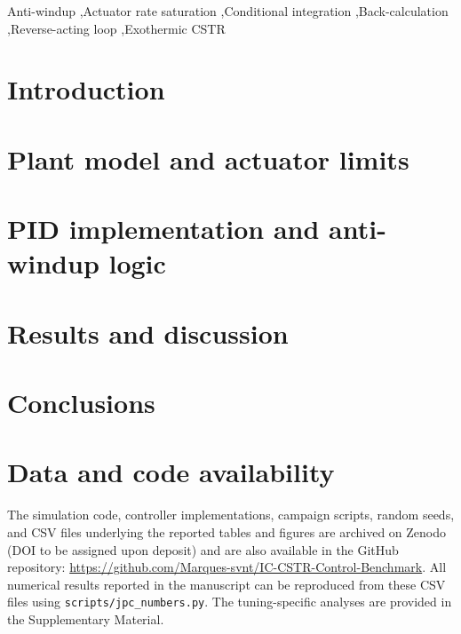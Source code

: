 \documentclass[a4paper,fleqn]{cas-dc}
\begin{document}


\begin{keywords}
Anti-windup \sep Actuator rate saturation \sep Conditional integration \sep Back-calculation \sep Reverse-acting loop \sep Exothermic CSTR
\end{keywords}

\maketitle

\section{Introduction}\label{sec:intro}


\section{Plant model and actuator limits}\label{sec:model}


\section{PID implementation and anti-windup logic}\label{sec:pid}


\section{Results and discussion}\label{sec:results}


\section{Conclusions}\label{sec:conclusion}


\section*{Data and code availability}
The simulation code, controller implementations, campaign scripts, random seeds, and CSV files underlying the reported tables and figures are archived on Zenodo \cite{andrade2026software} (DOI to be assigned upon deposit) and are also available in the GitHub repository: \url{https://github.com/Marques-svnt/IC-CSTR-Control-Benchmark}. All numerical results reported in the manuscript can be reproduced from these CSV files using \texttt{scripts/jpc\_numbers.py}. The tuning-specific analyses are provided in the Supplementary Material.
\end{document}
